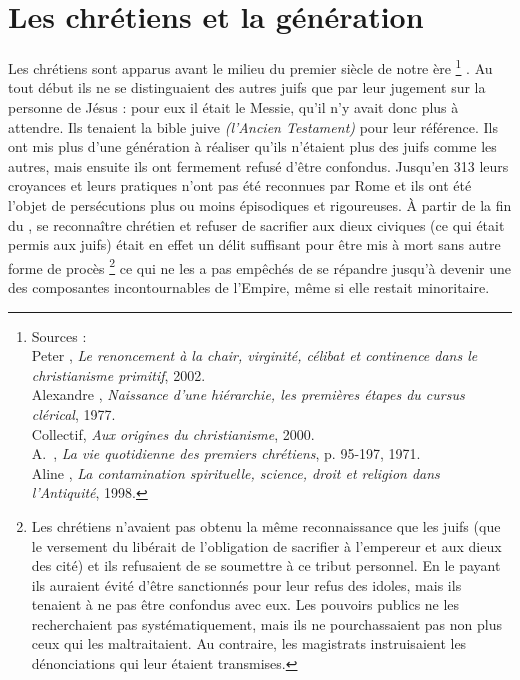


\chapter{Les chrétiens et la génération}


 Les chrétiens sont apparus avant le milieu du premier siècle de notre ère%
\footnote{Sources :\\
Peter , \emph{Le renoncement à la chair, virginité, célibat et continence dans le christianisme primitif}, 2002.\\
Alexandre , \emph{Naissance d'une hiérarchie, les premières étapes du cursus clérical}, 1977.\\
Collectif, \emph{Aux origines du christianisme}, 2000.\\
A.~, \emph{La vie quotidienne des premiers chrétiens}, p. 95-197, 1971.\\
Aline , \emph{La contamination spirituelle, science, droit et religion dans l'Antiquité}, 1998.}%
. Au tout début ils ne se distinguaient des autres juifs que par leur jugement sur la personne de Jésus : pour eux il était le Messie, qu'il n'y avait donc plus à attendre. Ils tenaient la bible juive \emph{(l'Ancien Testament)} pour leur référence. Ils ont mis plus d'une génération à réaliser qu'ils n'étaient plus des juifs comme les autres, mais ensuite ils ont fermement refusé d'être confondus. Jusqu'en 313 leurs croyances et leurs pratiques n'ont pas été reconnues par Rome et ils ont été l'objet de persécutions plus ou moins épisodiques et rigoureuses. À partir de la fin du , se reconnaître chrétien et refuser de sacrifier aux dieux civiques (ce qui était permis aux juifs) était en effet un délit suffisant pour être mis à mort sans autre forme de procès%
\footnote{Les chrétiens n'avaient pas obtenu la même reconnaissance que les juifs (que le versement du  libérait de l'obligation de sacrifier à l'empereur et aux dieux des cité) et ils refusaient de se soumettre à ce tribut personnel. En le payant ils auraient évité d'être sanctionnés pour leur refus des idoles, mais ils tenaient à ne pas être confondus avec eux. Les pouvoirs publics ne les recherchaient pas systématiquement, mais ils ne pourchassaient pas non plus ceux qui les maltraitaient. Au contraire, les magistrats instruisaient les dénonciations qui leur étaient transmises.}
ce qui ne les a pas empêchés de se répandre jusqu'à devenir une des composantes incontournables de l'Empire, même si elle restait minoritaire. 


